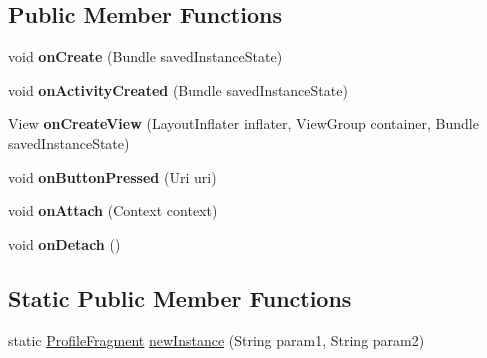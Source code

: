 \subsection*{Public Member Functions}
\begin{DoxyCompactItemize}
\item 
\hypertarget{classcom_1_1example_1_1sel_1_1lostfound_1_1ProfileFragment_a52a51c0a57347d86da5de367f715076f}{void {\bfseries on\-Create} (Bundle saved\-Instance\-State)}\label{classcom_1_1example_1_1sel_1_1lostfound_1_1ProfileFragment_a52a51c0a57347d86da5de367f715076f}

\item 
\hypertarget{classcom_1_1example_1_1sel_1_1lostfound_1_1ProfileFragment_a1930f4c070b5d7a4204422f4e0ddc35f}{void {\bfseries on\-Activity\-Created} (Bundle saved\-Instance\-State)}\label{classcom_1_1example_1_1sel_1_1lostfound_1_1ProfileFragment_a1930f4c070b5d7a4204422f4e0ddc35f}

\item 
\hypertarget{classcom_1_1example_1_1sel_1_1lostfound_1_1ProfileFragment_a7bb29240ea89cc1f9c5539dd9117765e}{View {\bfseries on\-Create\-View} (Layout\-Inflater inflater, View\-Group container, Bundle saved\-Instance\-State)}\label{classcom_1_1example_1_1sel_1_1lostfound_1_1ProfileFragment_a7bb29240ea89cc1f9c5539dd9117765e}

\item 
\hypertarget{classcom_1_1example_1_1sel_1_1lostfound_1_1ProfileFragment_a5d06af34470ca3d940361d9315cd98fb}{void {\bfseries on\-Button\-Pressed} (Uri uri)}\label{classcom_1_1example_1_1sel_1_1lostfound_1_1ProfileFragment_a5d06af34470ca3d940361d9315cd98fb}

\item 
\hypertarget{classcom_1_1example_1_1sel_1_1lostfound_1_1ProfileFragment_a22ef41a710d02636086eb5b6b01a2e1e}{void {\bfseries on\-Attach} (Context context)}\label{classcom_1_1example_1_1sel_1_1lostfound_1_1ProfileFragment_a22ef41a710d02636086eb5b6b01a2e1e}

\item 
\hypertarget{classcom_1_1example_1_1sel_1_1lostfound_1_1ProfileFragment_a922ba5757676d5642082baaed332dfb1}{void {\bfseries on\-Detach} ()}\label{classcom_1_1example_1_1sel_1_1lostfound_1_1ProfileFragment_a922ba5757676d5642082baaed332dfb1}

\end{DoxyCompactItemize}
\subsection*{Static Public Member Functions}
\begin{DoxyCompactItemize}
\item 
static \hyperlink{classcom_1_1example_1_1sel_1_1lostfound_1_1ProfileFragment}{Profile\-Fragment} \hyperlink{classcom_1_1example_1_1sel_1_1lostfound_1_1ProfileFragment_a2a0246ef59fbd7dd833eb7db772302c6}{new\-Instance} (String param1, String param2)
\end{DoxyCompactItemize}


